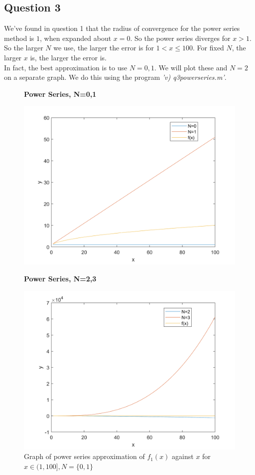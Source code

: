 \documentclass[10pt]{article}
\begin{document}
\subsection*{Question 3}
We've found in question 1 that the radius of convergence for the power series method is $1$, when expanded about $x=0$. So the power series diverges for $x>1$. So the larger $N$ we use, the larger the error is for $1<x\leq100$. For fixed $N$, the larger $x$ is, the larger the error is.\\
In fact, the best approximation is to use $N=0,1$. We will plot these and $N=2$ on a separate graph. We do this using the program \emph{'v) q3\textunderscore power\textunderscore series.m'}.
\begin{figure}[H]
    \begin{minipage}[b]{0.47\linewidth}
            \centering
            \textbf{Power Series, N=0,1}\par
            \includegraphics[width=\textwidth]{Files/q3_ps,N=0,1.png}
            \caption{Graph of power series approximation of $f_1(x)$ against $x$ for $x\in(1,100],N=\{0,1\}$}
        \end{minipage}
        \hfill
    \begin{minipage}[b]{0.47\linewidth}
            \centering
            \textbf{Power Series, N=2,3}\par
            \includegraphics[width=\textwidth]{Files/q3_ps,N=2,3.png}

\end{minipage}
\end{figure}
\end{document}
